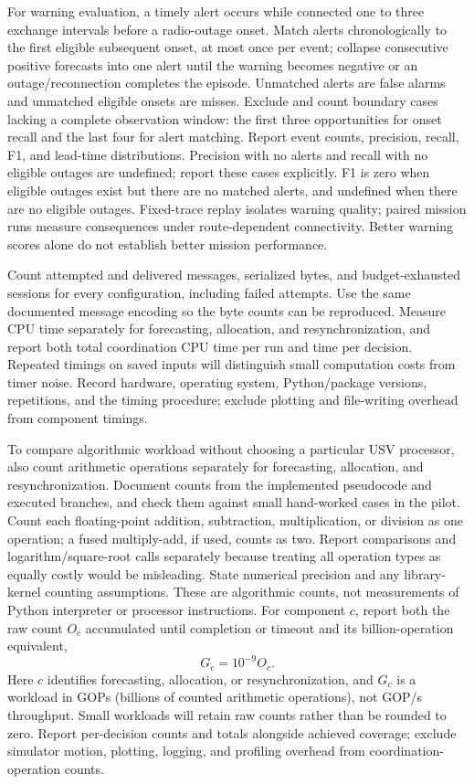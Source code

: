 For warning evaluation, a timely alert occurs while connected one to three exchange intervals before a radio-outage onset. Match alerts chronologically to the first eligible subsequent onset, at most once per event; collapse consecutive positive forecasts into one alert until the warning becomes negative or an outage/reconnection completes the episode. Unmatched alerts are false alarms and unmatched eligible onsets are misses. Exclude and count boundary cases lacking a complete observation window: the first three opportunities for onset recall and the last four for alert matching. Report event counts, precision, recall, F1, and lead-time distributions. Precision with no alerts and recall with no eligible outages are undefined; report these cases explicitly. F1 is zero when eligible outages exist but there are no matched alerts, and undefined when there are no eligible outages. Fixed-trace replay isolates warning quality; paired mission runs measure consequences under route-dependent connectivity. Better warning scores alone do not establish better mission performance.

Count attempted and delivered messages, serialized bytes, and budget-exhausted sessions for every configuration, including failed attempts. Use the same documented message encoding so the byte counts can be reproduced. Measure CPU time separately for forecasting, allocation, and resynchronization, and report both total coordination CPU time per run and time per decision. Repeated timings on saved inputs will distinguish small computation costs from timer noise. Record hardware, operating system, Python/package versions, repetitions, and the timing procedure; exclude plotting and file-writing overhead from component timings.

To compare algorithmic workload without choosing a particular USV processor, also count arithmetic operations separately for forecasting, allocation, and resynchronization. Document counts from the implemented pseudocode and executed branches, and check them against small hand-worked cases in the pilot. Count each floating-point addition, subtraction, multiplication, or division as one operation; a fused multiply-add, if used, counts as two. Report comparisons and logarithm/square-root calls separately because treating all operation types as equally costly would be misleading. State numerical precision and any library-kernel counting assumptions. These are algorithmic counts, not measurements of Python interpreter or processor instructions. For component $c$, report both the raw count $O_c$ accumulated until completion or timeout and its billion-operation equivalent,
\begin{equation}
\label{eq:gop-count}
G_c=10^{-9}O_c.
\end{equation}
Here $c$ identifies forecasting, allocation, or resynchronization, and $G_c$ is a workload in GOPs (billions of counted arithmetic operations), not GOP/s throughput. Small workloads will retain raw counts rather than be rounded to zero. Report per-decision counts and totals alongside achieved coverage; exclude simulator motion, plotting, logging, and profiling overhead from coordination-operation counts.

